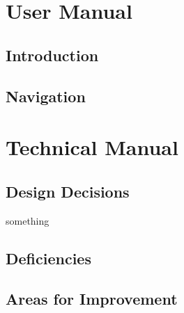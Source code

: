 \documentclass[10pt]{report}
\begin{document}
\clearpage
\section*{User Manual}
\subsection*{Introduction}



\subsection*{Navigation}


\clearpage
\section*{Technical Manual}
\subsection*{Design Decisions}

\begin{description}
\item[something]
\end{description}

\subsection*{Deficiencies}

\subsection*{Areas for Improvement}
\end{document}
